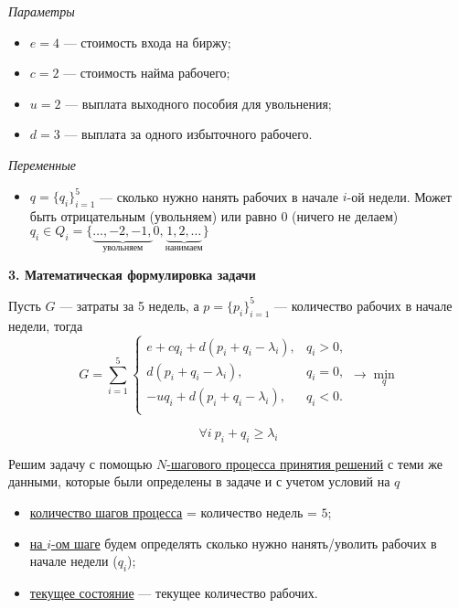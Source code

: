 \bigskip

\textit{Параметры}

\begin{itemize}[nosep]
	\item $e = 4$ --- стоимость входа на биржу;
	
	\item $c = 2$ --- стоимость найма рабочего;
	
	\item $u = 2$ --- выплата выходного пособия для увольнения;
	
	\item $d = 3$ --- выплата за одного избыточного рабочего. 
\end{itemize}

\bigskip

\textit{Переменные}

\begin{itemize}[nosep]	
	\item $q = \{q_i\}_{i=1}^5$ --- сколько нужно нанять рабочих в начале $i$-ой недели. Может быть отрицательным (увольняем) или равно 0 (ничего не делаем) $q_i \in Q_i = \{\underbrace{\dots, -2, -1,}_{\text{увольняем}} 0, \underbrace{1, 2, \dots}_{\text{нанимаем}}\}$
\end{itemize}

\bigskip

\textbf{3. Математическая формулировка задачи}

Пусть $G$ --- затраты за 5 недель, а $p = \{p_i\}_{i=1}^5$ --- количество рабочих в начале недели, тогда
\[G = \sum_{i=1}^{5}  \begin{cases}\tag{*}
	e + cq_i + d(p_i + q_i - \lambda_i),& q_i > 0, \\
	d(p_i + q_i - \lambda_i),& q_i = 0, \\
	-uq_i + d(p_i + q_i - \lambda_i),& q_i < 0. \\
\end{cases}  \to \min_{q}\]

\[\forall  i \ p_i + q_i \ge \lambda_i \tag{*}\]

\solution
Решим задачу с помощью \hyperref[n_step_process]{$N$-шагового процесса принятия решений} с теми же данными, которые были определены в задаче и с учетом условий на $q$

\begin{itemize}[nosep]
	\item \underline{количество шагов процесса} = количество недель = $5$;
	
	\item \underline{на $i$-ом шаге} будем определять сколько нужно нанять/уволить рабочих в начале недели ($q_i$);
	
	\item \underline{текущее состояние} --- текущее количество рабочих.
\end{itemize}

